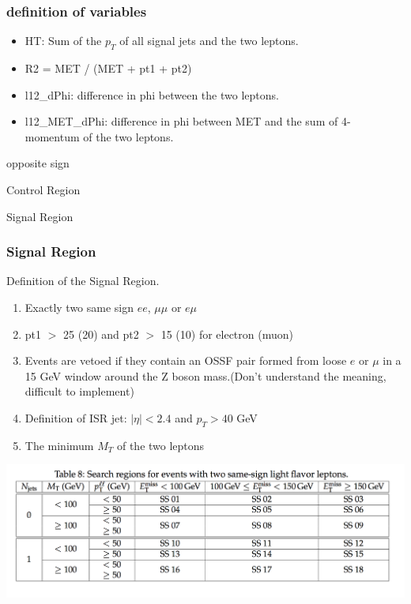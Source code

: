 \documentclass[mathserif,serif]{beamer}
\begin{document}
\begin{frame}
\frametitle{definition of variables}
\normalsize
\begin{itemize}
\item HT: Sum of the $p_T$ of all signal jets and the two leptons.
\item R2 = MET / (MET + pt1 + pt2)
\item l12\_dPhi: difference in phi between the two leptons.
\item l12\_MET\_dPhi: difference in phi between MET and the sum of 4-momentum of the two leptons.
\end{itemize}
\end{frame}

\begin{frame}
\begin{center}
\huge
opposite sign
\end{center}
\end{frame}


%

\def \PathToPlot {../plot}


\begin{frame}
\begin{center}
\huge
Control Region
\end{center}
\end{frame}



\def \PathToPlot {../plot}


\begin{frame}
\begin{center}
\huge
Signal Region
\end{center}
\end{frame}

\begin{frame}
\frametitle{Signal Region}
Definition of the Signal Region.
\begin{enumerate}
\item Exactly two same sign $ee$, $\mu\mu$ or $e\mu$
\item pt1 $>$ 25 (20) and pt2 $>$ 15 (10) for electron (muon)
\item Events are vetoed if they contain an OSSF pair formed from loose $e$ or $\mu$ in a 15 GeV window around the Z boson mass.(Don't understand the meaning, difficult to implement)
\item Definition of ISR jet: $|\eta| < 2.4$ and $p_T > 40$ GeV
\item The minimum $M_T$ of the two leptons
\end{enumerate}
\includegraphics[width=1\textwidth]{data/photo/SR.png}
\end{frame}
\end{document}
